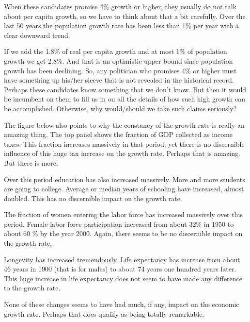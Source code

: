 \documentclass[
]{book}
\begin{document}
When these candidates promise 4\% growth or higher, they usually do not talk about per capita growth, so we have to think about that a bit carefully. Over the last 50 years the population growth rate has been less than 1\% per year with a clear downward trend.

If we add the 1.8\% of real per capita growth and at most 1\% of population growth we get 2.8\%. And that is an optimistic upper bound since population growth has been declining. So, any politician who promises 4\% or higher must have something up his/her sleeve that is not revealed in the historical record. Perhaps these candidates know something that we don't know. But then it would be incumbent on them to fill us in on all the details of how such high growth can be accomplished. Otherwise, why would/should we take such claims seriously?

The figure below also points to why the constancy of the growth rate is really an amazing thing. The top panel shows the fraction of GDP collected as income taxes. This fraction increases massively in that period, yet there is no discernible influence of this huge tax increase on the growth rate. Perhaps that is amazing. But there is more.

Over this period education has also increased massively. More and more students are going to college. Average or median years of schooling have increased, almost doubled. This has no discernible impact on the growth rate.

The fraction of women entering the labor force has increased massively over this period. Female labor force participation increased from about 32\% in 1950 to about 60 \% by the year 2000. Again, there seems to be no discernible impact on the growth rate.

Longevity has increased tremendously. Life expectancy has increase from about 46 years in 1900 (that is for males) to about 74 years one hundred years later. This huge increase in life expectancy does not seem to have made any difference to the growth rate.

None of these changes seems to have had much, if any, impact on the economic growth rate. Perhaps that does qualify as being totally remarkable.
\end{document}
